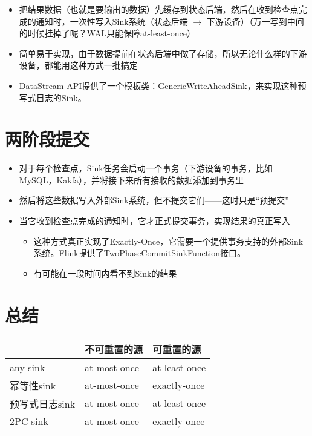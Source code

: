 \documentclass[cn,11pt,chinese]{elegantbook}
\begin{document}
\begin{itemize}
  \item 把结果数据（也就是要输出的数据）先缓存到状态后端，然后在收到检查点完成的通知时，一次性写入Sink系统（状态后端 $\rightarrow$ 下游设备）（万一写到中间的时候挂掉了呢？WAL只能保障at-least-once）
  \item 简单易于实现，由于数据提前在状态后端中做了存储，所以无论什么样的下游设备，都能用这种方式一批搞定
  \item DataStream API提供了一个模板类：GenericWriteAheadSink，来实现这种预写式日志的Sink。
\end{itemize}

\section{两阶段提交}

\begin{itemize}
  \item 对于每个检查点，Sink任务会启动一个事务（下游设备的事务，比如MySQL，Kakfa），并将接下来所有接收的数据添加到事务里
  \item 然后将这些数据写入外部Sink系统，但不提交它们——这时只是“预提交”
  \item 当它收到检查点完成的通知时，它才正式提交事务，实现结果的真正写入
  \begin{itemize}
      \item 这种方式真正实现了Exactly-Once，它需要一个提供事务支持的外部Sink系统。Flink提供了TwoPhaseCommitSinkFunction接口。
      \item 有可能在一段时间内看不到Sink的结果
  \end{itemize}
\end{itemize}

\section{总结}

\begin{center}
  \begin{tabular}{|l|l|l|}
  \hline
  & 不可重置的源 & 可重置的源 \\
  \hline
  any sink & at-most-once & at-least-once \\
  \hline
  幂等性sink & at-most-once & exactly-once \\
  \hline
  预写式日志sink & at-most-once & at-least-once \\
  \hline
  2PC sink & at-most-once & exactly-once \\
  \hline
  \end{tabular}%
\end{center}
\end{document}
